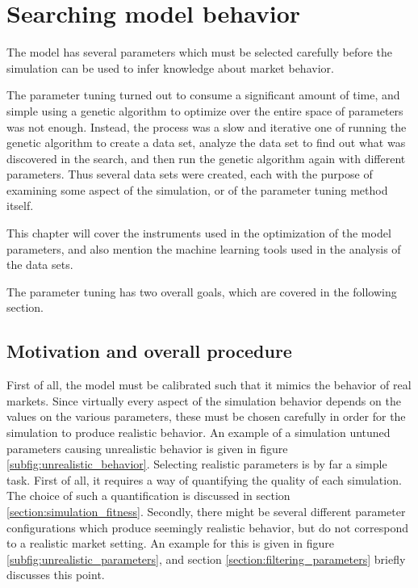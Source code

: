 
\chapter{Searching model behavior} %



	

The model has several parameters which must be selected carefully before the simulation can be used to infer knowledge about market behavior. 

The parameter tuning turned out to consume a significant amount of time, and simple using a genetic algorithm to optimize over the entire space of parameters was not enough. Instead, the process was a slow and iterative one of running the genetic algorithm to create a data set, analyze the data set to find out what was discovered in the search, and then run the genetic algorithm again with different parameters. Thus several data sets were created, each with the purpose of examining some aspect of the simulation, or of the parameter tuning method itself. 

This chapter will cover the instruments used in the optimization of the model parameters, and also mention the machine learning tools used in the analysis of the data sets. 

The parameter tuning has two overall goals, which are covered in the following section.

\section{Motivation and overall procedure}
First of all, the model must be calibrated such that it mimics the behavior of real markets. Since virtually every aspect of the simulation behavior depends on the values on the various parameters, these must be chosen carefully in order for the simulation to produce realistic behavior. An example of a simulation untuned parameters causing  unrealistic behavior is given in figure \ref{subfig:unrealistic_behavior}. Selecting realistic parameters is by far a simple task. First of all, it requires a way of quantifying the quality of each simulation. The choice of such a quantification is discussed in section \ref{section:simulation_fitness}. Secondly, there might be several different parameter configurations which produce seemingly realistic behavior, but do not correspond to a realistic market setting. An example for this is given in figure \ref{subfig:unrealistic_parameters}, and section \ref{section:filtering_parameters} briefly discusses this point. 

